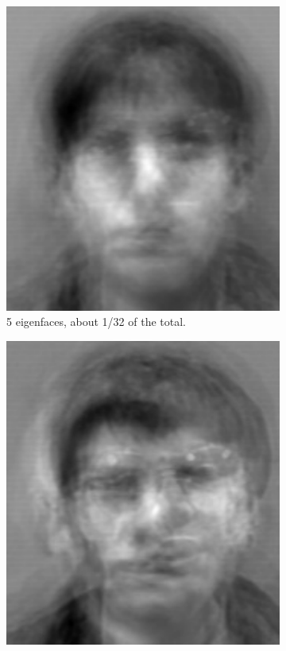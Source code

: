 \begin{figure}
\begin{subfigure}[b]{0.3\textwidth}
    \includegraphics[width=\textwidth]{figures/rebuiltThirtySecond.pdf}
    \caption{5 eigenfaces, about 1/32 of the total.}
    \label{fig:5_efaces}
\end{subfigure}
\begin{subfigure}[b]{0.3\textwidth}
    \includegraphics[width=\textwidth]{figures/rebuiltSixteenth.pdf}

\end{subfigure}
\end{figure}
